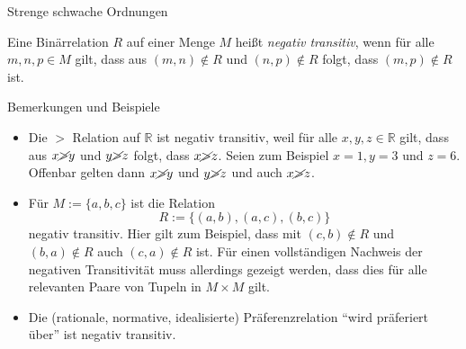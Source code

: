 \documentclass[
  8pt,
  ignorenonframetext,
]{beamer}
\providecommand{\tightlist}{%
  \setlength{\itemsep}{0pt}\setlength{\parskip}{0pt}}
\begin{document}
\begin{frame}{Strenge schwache Ordnungen}
\protect\hypertarget{strenge-schwache-ordnungen-1}{}
\small
\begin{definition}
\justifying
Eine Binärrelation $R$ auf einer Menge $M$ heißt \textit{negativ transitiv}, wenn
für alle $m,n,p\in M$ gilt, dass aus $(m,n) \notin R$ und $(n,p)\notin R$ folgt,
dass $(m,p) \notin R$ ist.
\end{definition}

\footnotesize

Bemerkungen und Beispiele

\begin{itemize}
\tightlist
\item
  \justifying Die \(>\) Relation auf \(\mathbb{R}\) ist negativ
  transitiv, weil für alle \(x,y,z\in \mathbb{R}\) gilt, dass aus
  \(x\cancel{>}y\) und \(y\cancel{>}z\) folgt, dass \(x\cancel{>}z\).
  Seien zum Beispiel \(x = 1, y = 3\) und \(z = 6\). Offenbar gelten
  dann \(x \cancel{>} y\) und \(y \cancel{>} z\) und auch
  \(x \cancel{>} z\).
\item
  Für \(M := \{a,b,c\}\) ist die Relation \begin{equation}
  R := \{(a,b), (a,c), (b,c)\}
  \end{equation} negativ transitiv. Hier gilt zum Beispiel, dass mit
  \((c,b)\notin R\) und \((b,a) \notin R\) auch \((c,a) \notin R\) ist.
  Für einen vollständigen Nachweis der negativen Transitivität muss
  allerdings gezeigt werden, dass dies für alle relevanten Paare von
  Tupeln in \(M\times M\) gilt.
\item
  Die (rationale, normative, idealisierte) Präferenzrelation ``wird
  präferiert über'' ist negativ transitiv.
\end{itemize}
\end{frame}
\end{document}
